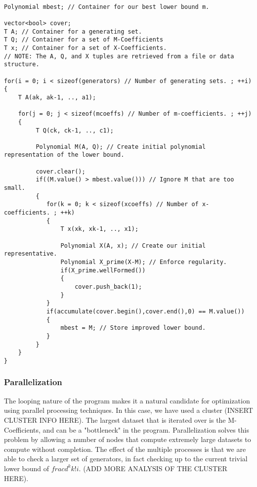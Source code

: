 \begin{lstlisting}

Polynomial mbest; // Container for our best lower bound m.

vector<bool> cover;
T A; // Container for a generating set.
T Q; // Container for a set of M-Coefficients
T x; // Container for a set of X-Coefficients.
// NOTE: The A, Q, and X tuples are retrieved from a file or data structure.

for(i = 0; i < sizeof(generators) // Number of generating sets. ; ++i)
{
    T A(ak, ak-1, .., a1);

    for(j = 0; j < sizeof(mcoeffs) // Number of m-coefficients. ; ++j)
    {
         T Q(ck, ck-1, .., c1); 
 
         Polynomial M(A, Q); // Create initial polynomial representation of the lower bound.
   
         cover.clear(); 
         if((M.value() > mbest.value())) // Ignore M that are too small.
         {
            for(k = 0; k < sizeof(xcoeffs) // Number of x-coefficients. ; ++k)
            {
                T x(xk, xk-1, .., x1);

                Polynomial X(A, x); // Create our initial representative.
                Polynomial X_prime(X-M); // Enforce regularity.
                if(X_prime.wellFormed())
                { 
                    cover.push_back(1);
                }
            }
            if(accumulate(cover.begin(),cover.end(),0) == M.value())
            {
                mbest = M; // Store improved lower bound.
            }
         }
    }
}

\end{lstlisting}

\subsubsection*{Parallelization}

The looping nature of the program makes it a natural candidate for optimization using parallel processing techniques. In this case, we have used a cluster (INSERT CLUSTER INFO HERE). The largest dataset that is iterated over is the M-Coefficients, and can be a "bottleneck" in the program. Parallelization solves this problem by allowing a number of nodes that compute extremely large datasets to compute without completion. The effect of the multiple processes is that we are able to check a larger set of generators, in fact checking up to the current trivial lower bound of $frac{d^k}{k!}i$. (ADD MORE ANALYSIS OF THE CLUSTER HERE).

